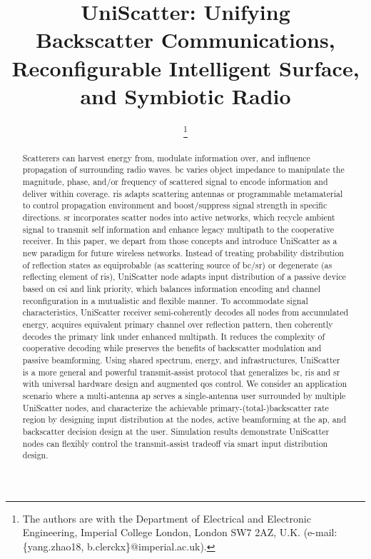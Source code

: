 \documentclass[journal]{IEEEtran}
\begin{document}
\title{UniScatter: Unifying\\Backscatter Communications, Reconfigurable Intelligent Surface, and Symbiotic Radio}
\author{
	\thanks{
		The authors are with the Department of Electrical and Electronic Engineering, Imperial College London, London SW7 2AZ, U.K. (e-mail: \{yang.zhao18, b.clerckx\}@imperial.ac.uk).
	}
}
\maketitle

\begin{abstract}
	Scatterers can harvest energy from, modulate information over, and influence propagation of surrounding radio waves.
	\gls{bc} varies object impedance to manipulate the magnitude, phase, and/or frequency of scattered signal to encode information and deliver within coverage.
	\gls{ris} adapts scattering antennas or programmable metamaterial to control propagation environment and boost/suppress signal strength in specific directions.
	\gls{sr} incorporates scatter nodes into active networks, which recycle ambient signal to transmit self information and enhance legacy multipath to the cooperative receiver.
	In this paper, we depart from those concepts and introduce UniScatter as a new paradigm for future wireless networks.
	Instead of treating probability distribution of reflection states as equiprobable (as scattering source of \gls{bc}/\gls{sr}) or degenerate (as reflecting element of \gls{ris}), UniScatter node adapts input distribution of a passive device based on \gls{csi} and link priority, which balances information encoding and channel reconfiguration in a mutualistic and flexible manner.
	To accommodate signal characteristics, UniScatter receiver semi-coherently decodes all nodes from accumulated energy, acquires equivalent primary channel over reflection pattern, then coherently decodes the primary link under enhanced multipath.
	It reduces the complexity of cooperative decoding while preserves the benefits of backscatter modulation and passive beamforming.
	Using shared spectrum, energy, and infrastructures, UniScatter is a more general and powerful transmit-assist protocol that generalizes \gls{bc}, \gls{ris} and \gls{sr} with universal hardware design and augmented \gls{qos} control.
	We consider an application scenario where a multi-antenna \gls{ap} serves a single-antenna user surrounded by multiple UniScatter nodes, and characterize the achievable primary-(total-)backscatter rate region by designing input distribution at the nodes, active beamforming at the \gls{ap}, and backscatter decision design at the user.
	Simulation results demonstrate UniScatter nodes can flexibly control the transmit-assist tradeoff via smart input distribution design.
\end{abstract}
\end{document}
